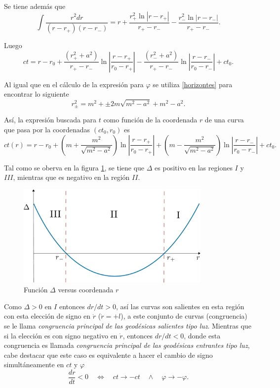 Se tiene adem\'as que
\begin{equation}
\int \frac{r^2dr}{(r-r_+)(r-r_-)}=r+\frac{r_{+}^2 \ln |r-r_+|}{r_+-r_-}-\frac{r_{-}^2\ln |r-r_-|}{r_+-r_-}.
\end{equation}

Luego
\begin{equation}
ct=r-r_0+\frac{(r_+^2+a^2)}{r_+-r_-}\ln\left|\frac{r-r_+}{r_0-r_+}\right|-\frac{(r_-^2+a^2)}{r_+-r_-}\ln \left|\frac{r-r_-}{r_0-r_-}\right|+ct_0.
\end{equation}

Al igual que en el c\'alculo de la expresi\'on para $\varphi$ se utiliza \eqref{horizontes} para encontrar lo siguiente
\begin{equation*}
r_{\pm}^2=m^2+\pm 2m\sqrt{m^2-a^2}+m^2-a^2.
\end{equation*}

As\'i, la expresi\'on buscada para $t$ como funci\'on de la coordenada $r$ de una curva que pasa por la coordenadas $(ct_0,r_0)$ es
\begin{equation}\label{congt}
\boxed{ct(r)=r-r_0+\left(m+\frac{m^2}{\sqrt{m^2-a^2}} \right)\ln\left|\frac{r-r_+}{r_0-r_+}\right|+\left(m-\frac{m^2}{\sqrt{m^2-a^2}} \right)\ln \left|\frac{r-r_-}{r_0-r_-}\right|+ct_0 .}
\end{equation}

Tal como se oberva en la figura \ref{fig:delta}, se tiene que $\Delta$ es positivo en las regiones $I$ y $III$, mientras que es negativo en la regi\'on $II$.

\begin{figure}[H]
 \centering
\includegraphics[height=5cm,angle=0]{fig/fig-delta.pdf}
\caption{Funci\'on $\Delta$ versus coordenada $r$}
\label{fig:delta}
\end{figure}

Como $\Delta >0$ en $I$ entonces $dr/dt>0$, as\'i las curvas son salientes en esta regi\'on con esta elecci\'on de signo en $\dot{r}$ ($\dot{r}=+l$),  a este conjunto de curvas (congruencia) se le llama \textit{congruencia principal de las geod\'esicas salientes tipo luz}. Mientras que si la elecci\'on es con signo negativo en $\dot{r}$, entonces $dr/dt<0$, donde esta congruencia es llamada \textit{congruencia principal de las geod\'esicas entrantes tipo luz}, cabe destacar que este caso es equivalente a hacer el cambio de signo simult\'aneamente en $ct$ y $\varphi$
\begin{equation}
\frac{dr}{dt}<0 \quad \Longleftrightarrow \quad ct \rightarrow -ct \quad \wedge \quad \varphi \rightarrow -\varphi .
\end{equation}

